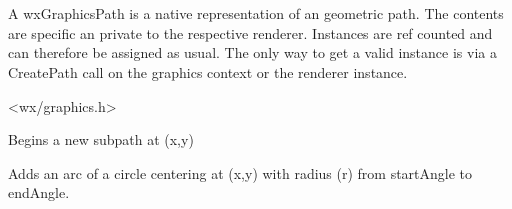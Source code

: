 
\section{}\label{wxgraphicspath}

A wxGraphicsPath is a native representation of an geometric path. The contents are specific an private to the respective renderer. Instances are ref counted and can 
therefore be assigned as usual. The only way to get a valid instance is via a CreatePath call on the graphics context or the renderer instance.




<wx/graphics.h>




\label{wxgraphicspathmovetopoint}



Begins a new subpath at (x,y)

\label{wxgraphicspathaddarc}


Adds an arc of a circle centering at (x,y) with radius (r) from startAngle to endAngle.



